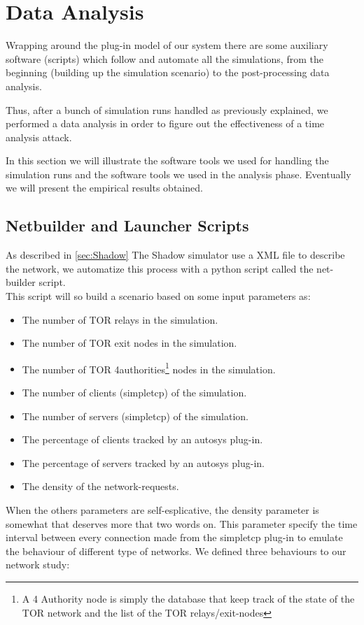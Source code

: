 \section{Data Analysis}
Wrapping around the plug-in model of our system there are some auxiliary
software (scripts)
which follow and automate all the simulations, from the beginning (building up
the simulation scenario) to the post-processing data analysis.

Thus, after a bunch of simulation runs handled as previously explained,
 we performed a data analysis in order to
figure out the effectiveness of a time analysis attack.  

In this section we will illustrate the software tools we used for
handling the
simulation runs and the software tools we used in the analysis phase. 
Eventually we will 
present the empirical results
obtained.
\subsection{Netbuilder and Launcher Scripts}
As described in \ref{sec:Shadow}
The Shadow simulator use a XML file to describe the network,
we automatize this process with a python script called the net-builder script.\\
This script will so build a scenario based on some input parameters as:
\begin{itemize}
\item The number of TOR relays in the simulation.
\item The number of TOR exit nodes in the simulation.
\item The number of TOR 4authorities\footnote{A 4 Authority node is simply the
database that keep track of the state of the TOR network and the list
of the TOR relays/exit-nodes} nodes in the simulation.
\item The number of clients (simpletcp) of the simulation.
\item The number of servers (simpletcp) of the simulation.
\item The percentage of clients tracked by an autosys plug-in.
\item The percentage of servers tracked by an autosys plug-in.
\item The density of the network-requests.
\end{itemize}

When the others parameters are self-esplicative, the density parameter is somewhat
that deserves more that two words on.
This parameter specify the time interval between every connection made from the
simpletcp plug-in to emulate the behaviour of different type of networks.
We defined three behaviours to our network study:

